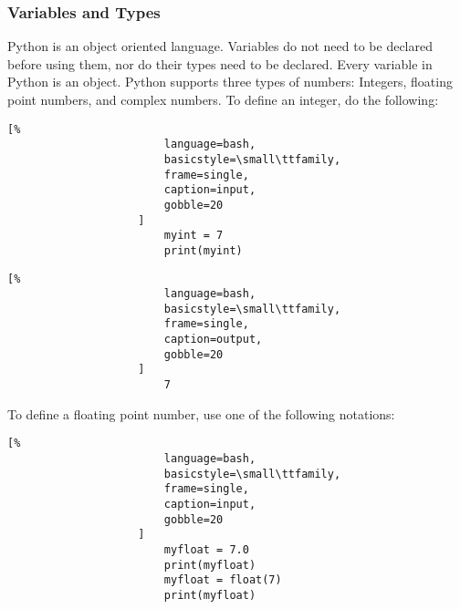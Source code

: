 \documentclass[crop=false,class=book,oneside]{standalone}
\begin{document}
            \subsubsection{Variables and Types}
                Python is an object oriented language.
                Variables do not need to be declared before using them,
                nor do their types need to be declared.
                Every variable in Python is an object.
                Python supports three types of numbers: Integers,
                floating point numbers, and complex numbers.
                To define an integer, do the following:\newline
                \begin{minipage}[t]{.48\textwidth}
                    \centering
                    \begin{lstlisting}[%
                        language=bash,
                        basicstyle=\small\ttfamily,
                        frame=single,
                        caption=input,
                        gobble=20
                    ]
                        myint = 7
                        print(myint)
                    \end{lstlisting}
                \end{minipage}
                \hfill
                \begin{minipage}[t]{.48\textwidth}
                    \centering
                    \begin{lstlisting}[%
                        language=bash,
                        basicstyle=\small\ttfamily,
                        frame=single,
                        caption=output,
                        gobble=20
                    ]
                        7
                    \end{lstlisting}
                \end{minipage}\newline
                To define a floating point number, use one of the
                following notations:
                \newline
                \begin{minipage}[t]{.48\textwidth}
                    \centering
                    \begin{lstlisting}[%
                        language=bash,
                        basicstyle=\small\ttfamily,
                        frame=single,
                        caption=input,
                        gobble=20
                    ]
                        myfloat = 7.0
                        print(myfloat)
                        myfloat = float(7)
                        print(myfloat)
                    \end{lstlisting}
                \end{minipage}
\end{document}
